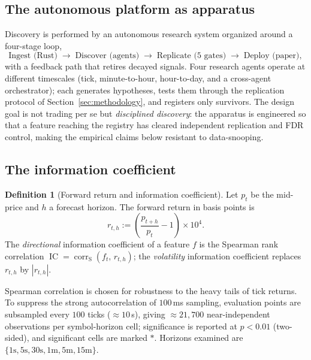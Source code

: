 \documentclass[11pt,a4paper]{article}
\theoremstyle{definition}
\newtheorem{definition}{Definition}[section]
\theoremstyle{plain}
\newcommand{\corr}{\operatorname{corr}}
\DeclareMathOperator{\IC}{IC}
\begin{document}
\subsection{The autonomous platform as apparatus}

Discovery is performed by an autonomous research system organized around a four-stage loop,
\[
  \text{Ingest (Rust)} \;\longrightarrow\; \text{Discover (agents)} \;\longrightarrow\;
  \text{Replicate (5 gates)} \;\longrightarrow\; \text{Deploy (paper)},
\]
with a feedback path that retires decayed signals. Four research agents operate at different
timescales (tick, minute-to-hour, hour-to-day, and a cross-agent orchestrator); each generates
hypotheses, tests them through the replication protocol of Section~\ref{sec:methodology}, and
registers only survivors. The design goal is not trading per se but \emph{disciplined discovery}:
the apparatus is engineered so that a feature reaching the registry has cleared independent
replication and FDR control, making the empirical claims below resistant to data-snooping.

\subsection{The information coefficient}

\begin{definition}[Forward return and information coefficient]
\label{def:ic}
Let $p_t$ be the mid-price and $h$ a forecast horizon. The forward return in basis points is
\begin{equation}
  r_{t,h} := \left(\frac{p_{t+h}}{p_t} - 1\right)\times 10^4 .
  \label{eq:fwd}
\end{equation}
The \emph{directional} information coefficient of a feature $f$ is the Spearman rank correlation
$\IC = \corr_{\mathrm{S}}(f_t,\, r_{t,h})$; the \emph{volatility} information coefficient replaces
$r_{t,h}$ by $|r_{t,h}|$.
\end{definition}

Spearman correlation is chosen for robustness to the heavy tails of tick returns. To suppress the
strong autocorrelation of $100$\,ms sampling, evaluation points are subsampled every $100$ ticks
($\approx 10$\,s), giving $\approx 21{,}700$ near-independent observations per symbol-horizon
cell; significance is reported at $p<0.01$ (two-sided), and significant cells are marked $*$.
Horizons examined are $\{1\text{s},5\text{s},30\text{s},1\text{m},5\text{m},15\text{m}\}$.

\end{document}
